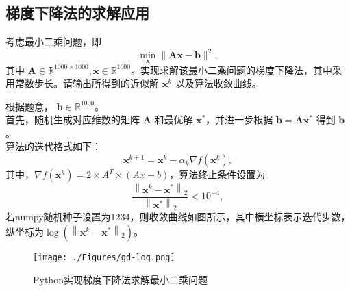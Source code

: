 \subsection{梯度下降法的求解应用}
\begin{example}[实践题]
    考虑最小二乘问题，即
    \begin{equation}
        \min _{\bm{x}}\|\bm{A} \bm{x}-\bm{b}\|^{2} ,
        \nonumber
    \end{equation}
其中 $\bm{A} \in \mathbb{R}^{1000 \times 1000}, \bm{x} \in \mathbb{R}^{1000}$。实现求解该最小二乘问题的梯度下降法，其中采用常数步长。请输出所得到的近似解 $\bm{x}^{k}$ 以及算法收敛曲线。
\end{example}
\begin{solution}
    根据题意， $\bm{b} \in \mathbb{R}^{1000}$。\\
    首先，随机生成对应维数的矩阵 $\bm{A}$ 和最优解 $\bm{x}^{*}$，并进一步根据 $\bm{b}=\bm{A} \bm{x}^{*}$ 得到 $\bm{b}$ 。\\
    算法的迭代格式如下：
    \begin{equation}
        \bm{x}^{k+1}=\bm{x}^{k}-\alpha_{k} \nabla f\left(\bm{x}^{k}\right),
        \nonumber
    \end{equation}
    其中，$\nabla f\left(\bm{x}^{k}\right)=2 \times A^T \times (Ax-b)$，算法终止条件设置为
    \begin{equation}
        \frac{\left\|\bm{x}^{k}-\bm{x}^{*}\right\|_{2}}{\left\|\bm{x}^{*}\right\|_{2}}<10^{-4},
        \nonumber
    \end{equation}
    若numpy随机种子设置为1234，则收敛曲线如图所示，其中横坐标表示迭代步数，纵坐标为$\log \left(\left\|\bm{x}^{k}-\bm{x}^{*}\right\|_{2}\right)$。
    \begin{figure}[hbtp]
        \centering
        \texttt{[image: ./Figures/gd-log.png]}
        \caption{Python实现梯度下降法求解最小二乘问题}
        \label{figure_gd}
    \end{figure}
\end{solution}
